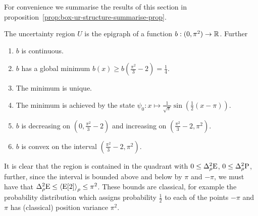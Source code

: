 For convenience we summarise the results of this section in proposition~\ref{prop:box-ur-structure-summarise-prop}.
\begin{prop}\label{prop:box-ur-structure-summarise-prop}
  The uncertainty region $U$ is the epigraph of a function $b:(0,\pi^2)\to \mathbb{R}$. Further
  \begin{enumerate}
    \item $b$ is continuous.
    \item $b$ has a global minimum $b(x)\geq b\left(\frac{\pi^2}{3} -2\right) = \frac{1}{4}$.
    \item The minimum is unique.
    \item The minimum is achieved by the state $\psi_0:x\mapsto \frac{1}{\sqrt{\pi}}\sin\left(\frac{1}{2}(x-\pi)\right)$.
    \item $b$ is decreasing on $\left(0,  \frac{\pi^2}{3} -2\right)$ and increasing on $\left(\frac{\pi^2}{3} -2, \pi^2\right)$.
    \item $b$ is convex on the interval $\left(\frac{\pi^2}{3} -2, \pi^2\right)$.
  \end{enumerate}
\end{prop}

It is clear that the region is contained in the quadrant with $0 \leq\var[\rho]{\ope}$, $0\leq\var[\rho]{\opp}$, further, since the interval is bounded above and below by $\pi$ and $-\pi$, we must have that $\var[\rho]{\ope} \leq \expe{\ope[2]}{\rho} \leq \pi^2$. These bounds are classical, for example the probability distribution which assigns probability $\frac{1}{2}$ to each of the points $-\pi$ and $\pi$ has (classical) position variance $\pi^2$.

